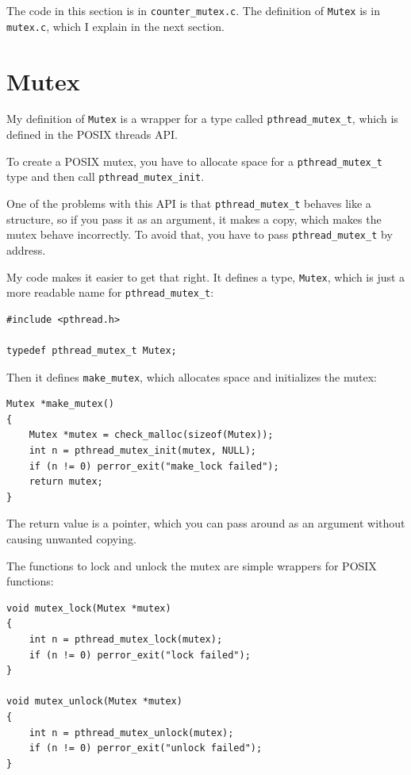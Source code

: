 \documentclass[12pt]{book}
\begin{document}
{The code in this section is in \verb"counter_mutex.c".
The definition of {\tt Mutex} is in {\tt mutex.c}, which I
explain in the next section.



\section{Mutex}

My definition of {\tt Mutex} is a wrapper for a type called
\verb"pthread_mutex_t", which is defined in the POSIX threads API.

To create a POSIX mutex, you have to allocate space for a
\verb"pthread_mutex_t" type and then call \verb"pthread_mutex_init".

One of the problems with this API is that \verb"pthread_mutex_t"
behaves like a structure, so if you pass it as an argument, it makes a
copy, which makes the mutex behave incorrectly.  To avoid that, you have to
pass \verb"pthread_mutex_t" by address.

My code makes it easier to get that right.  It defines a
type, {\tt Mutex}, which is just a more readable name for
\verb"pthread_mutex_t":

\begin{verbatim}
#include <pthread.h>

typedef pthread_mutex_t Mutex;
\end{verbatim}

Then it defines \verb"make_mutex", which allocates space and
initializes the mutex:

\begin{verbatim}
Mutex *make_mutex()
{
    Mutex *mutex = check_malloc(sizeof(Mutex));
    int n = pthread_mutex_init(mutex, NULL);
    if (n != 0) perror_exit("make_lock failed"); 
    return mutex;
}
\end{verbatim}

The return value is a pointer, which you can pass around as an
argument without causing unwanted copying.

The functions to lock and unlock the mutex are simple wrappers
for POSIX functions:

\begin{verbatim}
void mutex_lock(Mutex *mutex)
{
    int n = pthread_mutex_lock(mutex);
    if (n != 0) perror_exit("lock failed");
}

void mutex_unlock(Mutex *mutex)
{
    int n = pthread_mutex_unlock(mutex);
    if (n != 0) perror_exit("unlock failed");
}
\end{verbatim}

}
\end{document}
